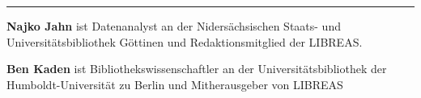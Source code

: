 \begin{center}\rule{0.5\linewidth}{\linethickness}\end{center}

\textbf{Najko Jahn} ist Datenanalyst an der Nidersächsischen Staats- und
Universitätsbibliothek Göttinen und Redaktionsmitglied der LIBREAS.

\textbf{Ben Kaden} ist Bibliothekswissenschaftler an der
Universitätsbibliothek der Humboldt-Universität zu Berlin und
Mitherausgeber von LIBREAS
